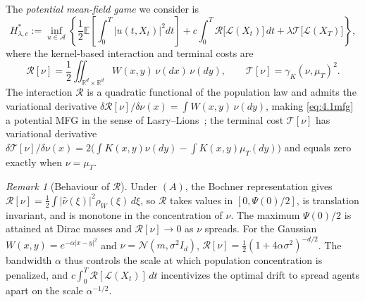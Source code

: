 \documentclass[11pt,leqno]{article}
\theoremstyle{plain}
\theoremstyle{remark}
\newtheorem{rem}[thm]{Remark}
\theoremstyle{definition}
\numberwithin{equation}{section}
\numberwithin{figure}{section}
\numberwithin{table}{section}
\numberwithin{algorithm}{section}
\newcommand{\EE}{\mathbb{E}}
\newcommand{\RR}{\mathbb{R}}
\begin{document}
The \emph{potential mean-field game} we consider is
\begin{equation}\label{eq:4.1mfg}
 H^*_{\lambda,c} := \inf_{u\in\mathcal{A}}\left\{
 \frac{1}{2}\EE\left[\int_0^T |u(t,X_t)|^2 dt\right]
 + c\int_0^T\mathcal{R}\bigl[\mathcal{L}(X_t)\bigr]\,dt
 + \lambda \mathcal{T}\bigl[\mathcal{L}(X_T)\bigr]\right\},
\end{equation}
where the kernel-based interaction and terminal costs are
\begin{equation}\label{eq:4.cost_decomp}
 \mathcal{R}[\nu] = \frac{1}{2}\iint\nolimits_{\RR^d\times\RR^d}W(x,y)\,\nu(dx)\,\nu(dy),
 \qquad
 \mathcal{T}[\nu] = \gamma_K(\nu,\mu_T)^2.
\end{equation}
The interaction $\mathcal{R}$ is a quadratic functional of the population law and admits the variational derivative
$\delta\mathcal{R}[\nu]/\delta\nu(x) = \int W(x,y)\,\nu(dy)$,
making \eqref{eq:4.1mfg} a potential MFG in the sense of Lasry--Lions~\cite{las-lio:2007};
the terminal cost $\mathcal{T}[\nu]$ has variational derivative
$\delta\mathcal{T}[\nu]/\delta\nu(x) = 2\bigl(\int K(x,y)\nu(dy)-\int K(x,y)\mu_T(dy)\bigr)$
and equals zero exactly when $\nu=\mu_T$.

\begin{rem}[Behaviour of $\mathcal{R}$]\label{rem:R_behaviour}
Under $(A)$, the Bochner representation gives
$\mathcal{R}[\nu] = \frac{1}{2}\int|\hat\nu(\xi)|^2\rho_W(\xi)\,d\xi$,
so $\mathcal{R}$ takes values in $[0,\Psi(0)/2]$, is translation invariant,
and is monotone in the concentration of $\nu$. 
The maximum $\Psi(0)/2$ is attained at Dirac masses and $\mathcal{R}[\nu]\to 0$ as $\nu$ spreads.
For the Gaussian $W(x,y)=e^{-\alpha|x-y|^2}$ and $\nu=\mathcal{N}(m,\sigma^2 I_d)$,
$\mathcal{R}[\nu]=\frac{1}{2}(1+4\alpha\sigma^2)^{-d/2}$.
The bandwidth $\alpha$ thus controls the scale at which population concentration is penalized, and 
$c\int_0^T\mathcal{R}[\mathcal{L}(X_t)]\,dt$ incentivizes the optimal drift to spread agents apart on the scale $\alpha^{-1/2}$.
\end{rem}
\end{document}
